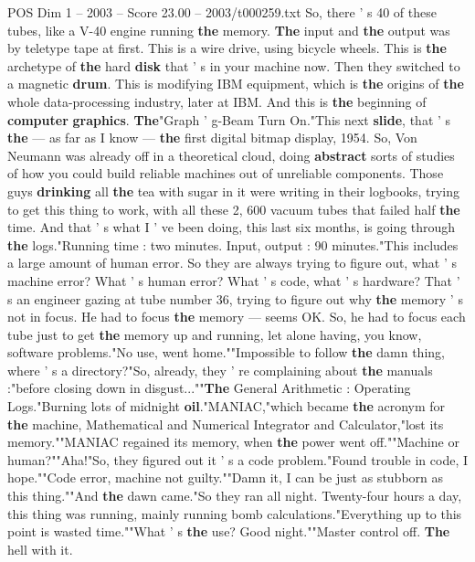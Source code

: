 \begin{textsample}{POS Dim 1 – 2003 – Score 23.00 – 2003/t000259.txt}
So, there ' s 40 of these tubes, like a V-40 engine running \textbf{the} memory. \textbf{The} input and \textbf{the} output was by teletype tape at first.
This is a wire drive, using bicycle wheels.
This is \textbf{the} archetype of \textbf{the} hard \textbf{disk} that ' s in your machine now.
Then they switched to a magnetic \textbf{drum}.
This is modifying IBM equipment, which is \textbf{the} origins of \textbf{the} whole data-processing industry, later at IBM.
And this is \textbf{the} beginning of \textbf{computer} \textbf{graphics}. \textbf{The}"Graph ' g-Beam Turn On."This next \textbf{slide}, that ' s \textbf{the} — as far as I know — \textbf{the} first digital bitmap display, 1954.
So, Von Neumann was already off in a theoretical cloud, doing \textbf{abstract} sorts of studies of how you could build reliable machines out of unreliable components.
Those guys \textbf{drinking} all \textbf{the} tea with sugar in it were writing in their logbooks, trying to get this thing to work, with all these 2, 600 vacuum tubes that failed half \textbf{the} time.
And that ' s what I ' ve been doing, this last six months, is going through \textbf{the} logs."Running time : two minutes.
Input, output : 90 minutes."This includes a large amount of human error.
So they are always trying to figure out, what ' s machine error?
What ' s human error?
What ' s code, what ' s hardware?
That ' s an engineer gazing at tube number 36, trying to figure out why \textbf{the} memory ' s not in focus.
He had to focus \textbf{the} memory — seems OK.
So, he had to focus each tube just to get \textbf{the} memory up and running, let alone having, you know, software problems."No use, went home.""Impossible to follow \textbf{the} damn thing, where ' s a directory?"So, already, they ' re complaining about \textbf{the} manuals :"before closing down in disgust...""\textbf{The} General Arithmetic : Operating Logs."Burning lots of midnight \textbf{oil}."MANIAC,"which became \textbf{the} acronym for \textbf{the} machine, Mathematical and Numerical Integrator and Calculator,"lost its memory.""MANIAC regained its memory, when \textbf{the} power went off.""Machine or human?""Aha!"So, they figured out it ' s a code problem."Found trouble in code, I hope.""Code error, machine not guilty.""Damn it, I can be just as stubborn as this thing.""And \textbf{the} dawn came."So they ran all night.
Twenty-four hours a day, this thing was running, mainly running bomb calculations."Everything up to this point is wasted time.""What ' s \textbf{the} use?
Good night.""Master control off. \textbf{The} hell with it.

\end{textsample}
